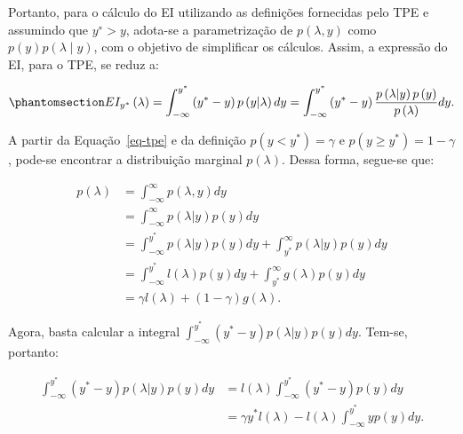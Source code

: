 \documentclass[
  12pt,
  a4paper,
]{scrreprt}
\begin{document}
\vspace{12pt}

Portanto, para o cálculo do EI utilizando as definições fornecidas pelo
TPE e assumindo que \(y^∗>y\), adota-se a parametrização de
\(p\left(\lambda,y\right)\) como
\(p\left(y\right)p\left(\lambda∣y\right)\), com o objetivo de
simplificar os cálculos. Assim, a expressão do EI, para o TPE, se reduz
a:

\begin{equation}\phantomsection\label{eq-exp}{
EI_{y^*}\left(\lambda\right) = \int_{-\infty}^{y^*} \left(y^* - y\right)p\left(y | \lambda\right) dy = \int_{-\infty}^{y^*} \left(y^* - y\right)\frac{p\left(\lambda | y\right) p\left(y \right)}{p\left(\lambda\right)} dy\text{.}
}\end{equation}

A partir da Equação~\ref{eq-tpe} e da definição
\(p\left(y < y^*\right) = \gamma\) e
\(p\left(y \geq y^*\right) = 1 - \gamma\), pode-se encontrar a
distribuição marginal \(p\left(\lambda\right)\). Dessa forma, segue-se
que:

\[
\begin{aligned}
p\left(\lambda\right) &= \int_{-\infty}^{\infty} p\left(\lambda, y\right) dy \\
&= \int_{-\infty}^{\infty} p\left(\lambda | y\right) p\left(y\right) dy \\
&= \int_{-\infty}^{y^*} p\left(\lambda | y\right) p\left(y\right) dy + \int_{y^*}^{\infty} p\left(\lambda | y\right) p\left(y\right) dy \\
&= \int_{-\infty}^{y^*} l\left(\lambda\right) p\left(y\right) dy + \int_{y^*}^{\infty} g\left(\lambda\right) p\left(y\right) dy \\
&= \gamma l\left(\lambda\right) + \left(1 - \gamma\right) g\left(\lambda\right)\text{.}
\end{aligned}
\]

Agora, basta calcular a integral
\(\int_{-\infty}^{y^*}\left(y^* - y\right) p\left(\lambda|y\right)p\left(y\right)dy\).
Tem-se, portanto:

\[
\begin{aligned}
\int_{-\infty}^{y^*}\left(y^* - y\right) p\left(\lambda|y\right)p\left(y\right)dy &= l\left(\lambda\right) \int_{-\infty}^{y^*} \left(y^* - y\right) p\left(y\right)dy \\
&= \gamma y^{*} l\left(\lambda\right) - l\left(\lambda\right) \int_{-\infty}^{y^*} y p\left(y\right)dy\text{.}
\end{aligned}
\]
\end{document}
